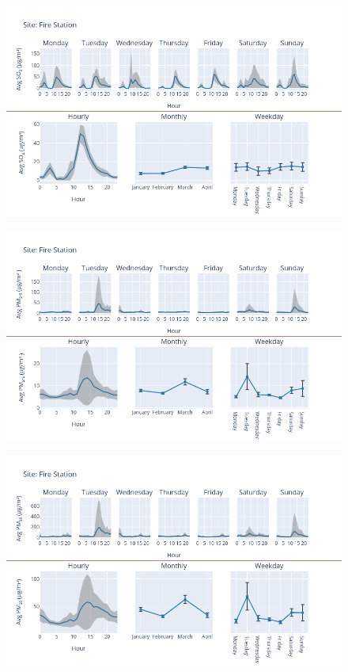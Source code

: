 \documentclass[12pt, oneside]{book}
\begin{document}
{ 
{\begin{figure}[H] 
 \centering 
\includegraphics[width=.88\textwidth, keepaspectratio]{image89} 
 \end{figure}}{} 

{\begin{figure}[H] 
 \centering 
\includegraphics[width=.88\textwidth, keepaspectratio]{image90} 
 \end{figure}}{} 

{\begin{figure}[H] 
 \centering 
\includegraphics[width=.88\textwidth, keepaspectratio]{image91} 
 \end{figure}}{} 

}
\end{document}
